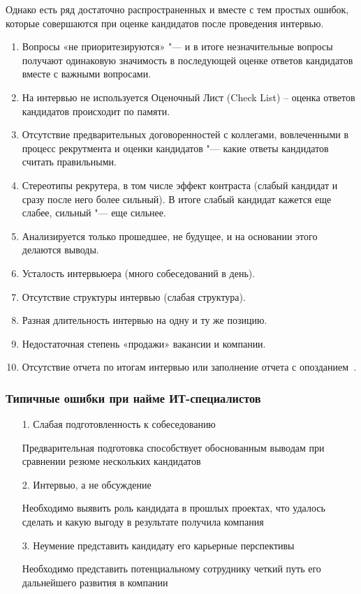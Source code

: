 \documentclass{../industrial-development}
\begin{document}
Однако есть ряд достаточно распространенных и вместе с тем простых ошибок, которые совершаются при оценке кандидатов после проведения интервью.
 \begin{enumerate}	
 \item Вопросы «не приоритезируются» "--- и в итоге незначительные вопросы получают одинаковую значимость в последующей оценке ответов кандидатов вместе с важными вопросами.

 \item На интервью не используется Оценочный Лист (Check List) – оценка ответов кандидатов происходит по памяти.

 \item Отсутствие предварительных договоренностей с коллегами, вовлеченными в процесс рекрутмента и оценки кандидатов "--- какие ответы кандидатов считать правильными.

 \item Стереотипы рекрутера, в том числе эффект контраста (слабый кандидат и сразу после него более сильный). В итоге слабый кандидат кажется еще слабее, сильный "--- еще сильнее.

 \item Анализируется только прошедшее, не будущее, и на основании этого делаются выводы.

 \item Усталость интервьюера (много собеседований в день).

 \item Отсутствие структуры интервью (слабая структура).

 \item Разная длительность интервью на одну и ту же позицию.

 \item Недостаточная степень «продажи» вакансии и компании.

 \item Отсутствие отчета по итогам интервью или заполнение отчета с опозданием~\cite{Samyerasp}. 
\end{enumerate}


\begin{frame} \frametitle{Типичные ошибки при найме ИТ-специалистов}
  \begin{itemize}
\item[1.] Слабая подготовленность к собеседованию

{\small Предварительная подготовка способствует обоснованным выводам при сравнении резюме нескольких кандидатов}

\item[2.] Интервью, а не обсуждение

{\small Необходимо выявить роль кандидата в прошлых проектах, что удалось сделать и какую выгоду в результате получила компания}

\item[3.] Неумение представить кандидату его карьерные перспективы

{\small Необходимо представить потенциальному сотруднику четкий путь его дальнейшего развития в компании}
 \end{itemize}
\end{frame}
\end{document}
